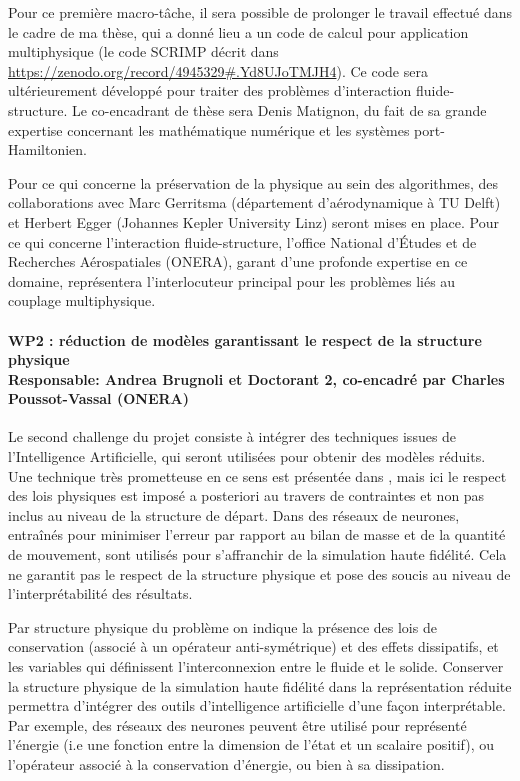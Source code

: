 \documentclass[12pt, french]{article}
\begin{document}
Pour ce première macro-tâche, il sera possible de prolonger le travail effectué dans le cadre de ma thèse, qui a donn\'e lieu a un code de calcul pour application multiphysique (le code SCRIMP décrit dans \url{https://zenodo.org/record/4945329#.Yd8UJoTMJH4}). Ce code sera ultérieurement développé pour traiter des problèmes d'interaction fluide-structure. Le co-encadrant de thèse sera Denis Matignon, du fait de sa grande expertise concernant les mathématique numérique et les systèmes port-Hamiltonien.

Pour ce qui concerne la préservation de la physique au sein des algorithmes, des collaborations avec Marc Gerritsma (département d'aérodynamique à TU Delft) et Herbert Egger (Johannes Kepler University Linz) seront mises en place. Pour ce qui concerne l'interaction fluide-structure, l'office National d'Études et de Recherches Aérospatiales (ONERA), garant d'une profonde expertise en ce domaine, représentera l'interlocuteur principal pour les problèmes liés au couplage multiphysique.

\paragraph{\large WP2 : réduction de modèles garantissant le respect de la structure physique\\
Responsable: Andrea Brugnoli et Doctorant 2, co-encadré par Charles Poussot-Vassal (ONERA)\\}

Le second challenge du projet consiste à intégrer des techniques issues de l’Intelligence
Artificielle, qui seront utilisées pour obtenir des modèles réduits. Une technique très prometteuse en ce sens est présentée dans \cite{lee2020}, mais ici le respect des lois physiques est imposé a posteriori au travers de contraintes et non pas inclus au niveau de la structure de départ. Dans \cite{sun2020physics} des réseaux de neurones, entraînés pour minimiser l’erreur par rapport au bilan de masse et de la quantité de mouvement, sont utilisés pour s’affranchir de la simulation haute fidélité. Cela ne garantit pas le respect de la structure physique et pose des soucis au niveau de l’interprétabilité des résultats.

Par structure physique du problème on indique la présence des lois de conservation (associé à un opérateur anti-symétrique) et des effets dissipatifs, et les variables qui définissent l'interconnexion entre le fluide et le solide. Conserver la structure physique de la simulation haute fidélité dans la représentation réduite permettra d’intégrer des outils d’intelligence artificielle d’une façon interprétable. Par exemple, des réseaux des neurones peuvent être utilisé pour représenté l'énergie (i.e une fonction entre la dimension de l'état et un scalaire positif), ou l'opérateur associé à la conservation d'énergie, ou bien à sa dissipation. 
\end{document}
